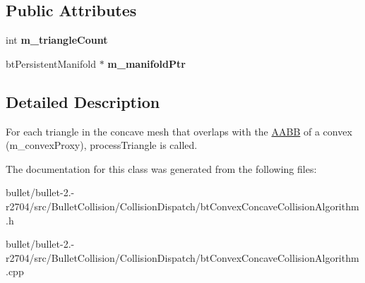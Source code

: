 \subsection*{Public Attributes}
\begin{DoxyCompactItemize}
\item 
\hypertarget{classbt_convex_triangle_callback_aeb7c14e970b2fc734f02787497f7b9b9}{int {\bfseries m\+\_\+triangle\+Count}}\label{classbt_convex_triangle_callback_aeb7c14e970b2fc734f02787497f7b9b9}

\item 
\hypertarget{classbt_convex_triangle_callback_ab481f4fd3200ce039021081787848eaa}{bt\+Persistent\+Manifold $\ast$ {\bfseries m\+\_\+manifold\+Ptr}}\label{classbt_convex_triangle_callback_ab481f4fd3200ce039021081787848eaa}

\end{DoxyCompactItemize}


\subsection{Detailed Description}
For each triangle in the concave mesh that overlaps with the \hyperlink{class_a_a_b_b}{A\+A\+B\+B} of a convex (m\+\_\+convex\+Proxy), process\+Triangle is called. 

The documentation for this class was generated from the following files\+:\begin{DoxyCompactItemize}
\item 
bullet/bullet-\/2.-\/r2704/src/\+Bullet\+Collision/\+Collision\+Dispatch/bt\+Convex\+Concave\+Collision\+Algorithm.\+h\item 
bullet/bullet-\/2.-\/r2704/src/\+Bullet\+Collision/\+Collision\+Dispatch/bt\+Convex\+Concave\+Collision\+Algorithm.\+cpp\end{DoxyCompactItemize}
